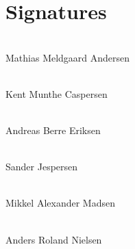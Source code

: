 \section*{Signatures}
\vspace{2cm}

\begin{center}
\makebox[8cm]{\hrulefill}\\
Mathias Meldgaard Andersen
\vspace{1.8cm}
\end{center}

\begin{center}
\makebox[8cm]{\hrulefill}\\
Kent Munthe Caspersen
\vspace{1.8cm}
\end{center}

\begin{center}
\makebox[8cm]{\hrulefill}\\
Andreas Berre Eriksen
\vspace{1.8cm}
\end{center}

\begin{center}
\makebox[8cm]{\hrulefill}\\
Sander Jespersen
\vspace{1.8cm}
\end{center}

\begin{center}
\makebox[8cm]{\hrulefill}\\
Mikkel Alexander Madsen
\vspace{1.8cm}
\end{center}

\begin{center}
\makebox[8cm]{\hrulefill}\\
Anders Roland Nielsen
\vspace{1.8cm}
\end{center}




